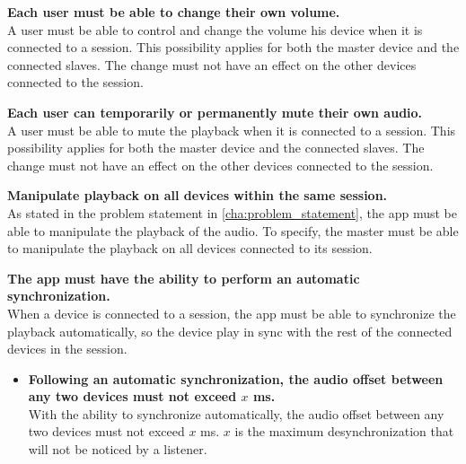 \begin{eletterate}
    \item \textbf{Each user must be able to change their own volume.} \hfill\\
        A user must be able to control and change the volume his device when it is connected to a session.
        This possibility applies for both the master device and the connected slaves.
        The change must not have an effect on the other devices connected to the session.

    \item \textbf{Each user can temporarily or permanently mute their own audio.} \hfill\\
        A user must be able to mute the playback when it is connected to a session.
        This possibility applies for both the master device and the connected slaves.
        The change must not have an effect on the other devices connected to the session.
    
    \item \textbf{Manipulate playback on all devices within the same session.} \hfill\\
        As stated in the problem statement in \cref{cha:problem_statement}, the app must be able to manipulate the playback of the audio. 
        To specify, the master must be able to manipulate the playback on all devices connected to its session.
    
    \item \textbf{The app must have the ability to perform an automatic synchronization.} \hfill\\
        When a device is connected to a session, the app must be able to synchronize the playback automatically,
        so the device play in sync with the rest of the connected devices in the session.

    \begin{itemize}
        \item \textbf{Following an automatic synchronization, the audio offset between any two devices must not exceed $x$ ms.} \hfill\\
            With the ability to synchronize automatically, the audio offset between any two devices must not exceed $x$ ms.
            $x$ is the maximum desynchronization that will not be noticed by a listener.


\end{itemize}
\end{eletterate}
